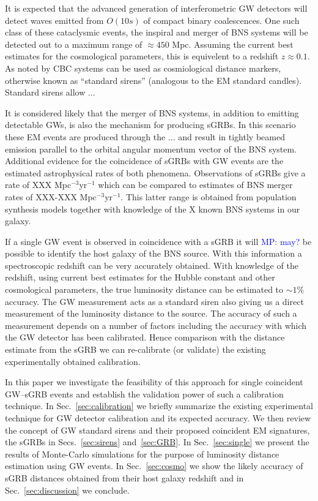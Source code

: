 \documentclass[12pt]{iopart}
\newcommand{\MP}[1]{\textcolor{blue}{MP: #1}}
\begin{document}
It is expected that the advanced generation of interferometric \ac{GW}
detectors will detect waves emitted from $O(10s)$ of compact binary
coalescences.  One such class of these cataclysmic events, the inspiral and
merger of \ac{BNS} systems will be detected out to a maximum range of $\approx
450$ Mpc. Assuming the current best estimates for the cosmological parameters,
this is equivelent to a redshift $z\approx 0.1$. As noted by \cite{1986Natur.323..310S} \ac{CBC}
systems can be used as cosmiological distance markers, otherwise known as
``standard sirens'' (analogous to the \ac{EM} standard candles). Standard sirens
allow ...

It is considered likely that the merger of \ac{BNS} systems, in addition to
emitting detectable \acp{GW}, is also the mechanism for producing \acp{sGRB}.
In this scenario these \ac{EM} events are produced through the ... and result
in tightly beamed emission parallel to the orbital angular momentum vector of
the \ac{BNS} system. Additional evidence for the coincidence of \acp{sGRB} with
\ac{GW} events are the estimated astrophysical rates of both phenomena.
Observations of \acp{sGRB} give a rate of XXX Mpc$^{-3}$yr$^{-1}$ which can be
compared to estimates of \ac{BNS} merger rates of XXX-XXX Mpc$^{-3}$yr$^{-1}$.
This latter range is obtained from population synthesis models together with
knowledge of the X known \ac{BNS} systems in our galaxy. 
  
If a single \ac{GW} event is observed in coincidence with a \ac{sGRB} it will \MP{may?}
be possible to identify the host galaxy of the \ac{BNS} source.  With this
information a spectroscopic redshift can be very accurately obtained. With
knowledge of the redshift, using current best estimates for the Hubble constant
and other cosmological parameters, the true luminosity distance can be
estimated to $\sim 1\%$ accuracy.  The \ac{GW} measurement acts as a standard
siren also giving us a direct measurement of the luminosity distance to the source.
The accuracy of such a measurement depends on a number of factors including the
accuracy with which the \ac{GW} detector has been calibrated.  Hence comparison
with the distance estimate from the \ac{sGRB} we can re-calibrate (or validate)
the existing experimentally obtained calibration. 

In this paper we investigate the feasibility of this approach for single
coincident \ac{GW}--\ac{sGRB} events and establish the validation power of such
a calibration technique.  In Sec.~\ref{sec:calibration} we briefly summarize
the existing experimental technique for \ac{GW} detector calibration and its
expected accuracy.  We then review the concept of \ac{GW} standard sirens and
their proposed coincident \ac{EM} signatures, the \acp{sGRB} in
Secs.~\ref{sec:sirens} and~\ref{sec:GRB}. In Sec.~\ref{sec:single} we present
the results of Monte-Carlo simulations for the purpose of luminosity distance
estimation using \ac{GW} events. In Sec.~\ref{sec:cosmo} we show the likely
accuracy of \ac{sGRB} distances obtained from their host galaxy redshift and in
Sec.~\ref{sec:discussion} we conclude.    
\end{document}
